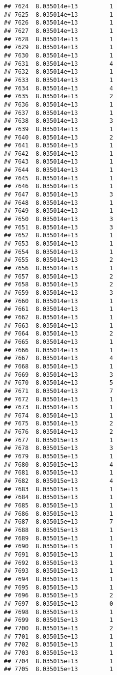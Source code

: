 \documentclass[
]{article}
\begin{document}
\begin{verbatim}
## 7624  8.035014e+13         1
## 7625  8.035014e+13         1
## 7626  8.035014e+13         1
## 7627  8.035014e+13         1
## 7628  8.035014e+13         1
## 7629  8.035014e+13         1
## 7630  8.035014e+13         1
## 7631  8.035014e+13         4
## 7632  8.035014e+13         1
## 7633  8.035014e+13         1
## 7634  8.035014e+13         4
## 7635  8.035014e+13         2
## 7636  8.035014e+13         1
## 7637  8.035014e+13         1
## 7638  8.035014e+13         3
## 7639  8.035014e+13         1
## 7640  8.035014e+13         2
## 7641  8.035014e+13         1
## 7642  8.035014e+13         1
## 7643  8.035014e+13         1
## 7644  8.035014e+13         1
## 7645  8.035014e+13         1
## 7646  8.035014e+13         1
## 7647  8.035014e+13         3
## 7648  8.035014e+13         1
## 7649  8.035014e+13         1
## 7650  8.035014e+13         3
## 7651  8.035014e+13         3
## 7652  8.035014e+13         1
## 7653  8.035014e+13         1
## 7654  8.035014e+13         1
## 7655  8.035014e+13         2
## 7656  8.035014e+13         1
## 7657  8.035014e+13         2
## 7658  8.035014e+13         2
## 7659  8.035014e+13         3
## 7660  8.035014e+13         1
## 7661  8.035014e+13         1
## 7662  8.035014e+13         1
## 7663  8.035014e+13         1
## 7664  8.035014e+13         2
## 7665  8.035014e+13         1
## 7666  8.035014e+13         1
## 7667  8.035014e+13         4
## 7668  8.035014e+13         1
## 7669  8.035014e+13         3
## 7670  8.035014e+13         5
## 7671  8.035014e+13         7
## 7672  8.035014e+13         1
## 7673  8.035014e+13         1
## 7674  8.035014e+13         1
## 7675  8.035014e+13         2
## 7676  8.035014e+13         2
## 7677  8.035015e+13         1
## 7678  8.035015e+13         3
## 7679  8.035015e+13         1
## 7680  8.035015e+13         4
## 7681  8.035015e+13         1
## 7682  8.035015e+13         4
## 7683  8.035015e+13         1
## 7684  8.035015e+13         1
## 7685  8.035015e+13         1
## 7686  8.035015e+13         1
## 7687  8.035015e+13         7
## 7688  8.035015e+13         1
## 7689  8.035015e+13         1
## 7690  8.035015e+13         1
## 7691  8.035015e+13         1
## 7692  8.035015e+13         1
## 7693  8.035015e+13         1
## 7694  8.035015e+13         1
## 7695  8.035015e+13         1
## 7696  8.035015e+13         2
## 7697  8.035015e+13         0
## 7698  8.035015e+13         1
## 7699  8.035015e+13         1
## 7700  8.035015e+13         2
## 7701  8.035015e+13         1
## 7702  8.035015e+13         1
## 7703  8.035015e+13         1
## 7704  8.035015e+13         1
## 7705  8.035015e+13         1

\end{verbatim}
\end{document}
